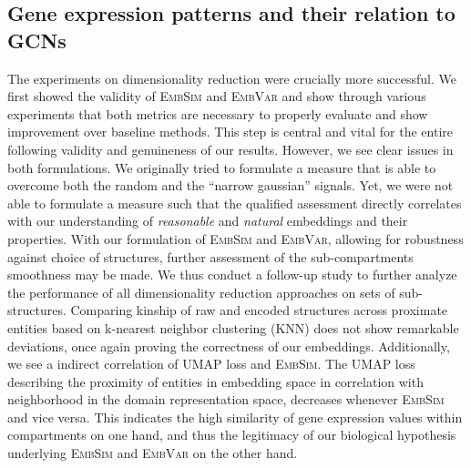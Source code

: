 \documentclass[]{article}
\begin{document}

\subsection{Gene expression patterns and their relation to GCNs}
\label{sec:disc_dimred}
The experiments on dimensionality reduction were crucially more successful. We first showed the validity of \textsc{EmbSim} and \textsc{EmbVar} and show through various experiments that both metrics are necessary to properly evaluate and show improvement over baseline methods. This step is central and vital for the entire following validity and genuineness of our results. However, we see clear issues in both formulations. We originally tried to formulate a measure that is able to overcome both the random and the ``narrow gaussian'' signals. Yet, we were not able to formulate a measure such that the qualified assessment directly correlates with our understanding of \textit{reasonable} and \textit{natural} embeddings and their properties. With our formulation of \textsc{EmbSim} and \textsc{EmbVar}, allowing for robustness against choice of structures, further assessment of the sub-compartments smoothness may be made. 
We thus conduct a follow-up study to further analyze the performance of all dimensionality reduction approaches on sets of sub-structures. Comparing kinship of raw and encoded structures across proximate entities based on k-nearest neighbor clustering (KNN) does not show remarkable deviations, once again proving the correctness of our embeddings. 
Additionally, we see a indirect correlation of UMAP loss and \textsc{EmbSim}. The UMAP loss describing the proximity of entities in embedding space in correlation with neighborhood in the domain representation space, decreases whenever \textsc{EmbSim} and vice versa. This indicates the high similarity of gene expression values within compartments on one hand, and thus the legitimacy of our biological hypothesis underlying \textsc{EmbSim} and \textsc{EmbVar} on the other hand. \\
\end{document}
